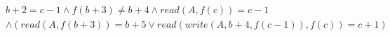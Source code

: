 \begin{align*}
%
& %
b + 2 = c - 1
%
\land
%
f(b + 3)  \neq  b + 4
%
\land
%
\mathit{read}(A,f(c)) = c - 1
~\\~
& %
%
\land
%
(\mathit{read}(A,f(b + 3)) = b + 5 \lor \mathit{read}(\mathit{write}(A,b + 4,f(c - 1)),f(c)) = c + 1)
%
\end{align*}

